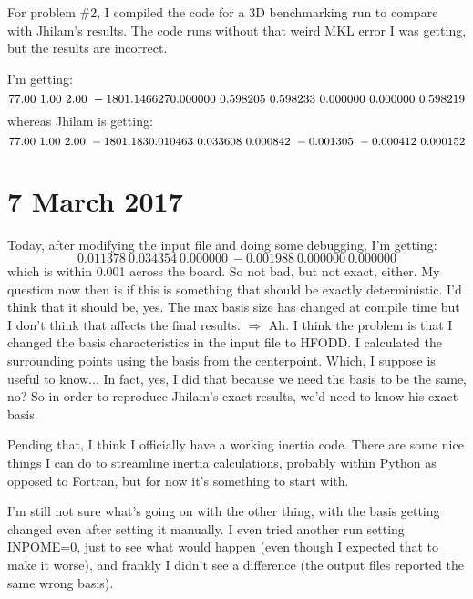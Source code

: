 \documentclass[]{report}
\begin{document}
For problem \#2, I compiled the code for a 3D benchmarking run to compare with Jhilam's results. The code runs without that weird MKL error I was getting, but the results are incorrect.

I'm getting:
\begin{equation}
   77.00\    1.00\    2.00\   -1801.146627 \\
       0.000000\    0.598205\    0.598233\    0.000000\    0.000000\    0.598219
\end{equation}
whereas Jhilam is getting:
\begin{equation}
   77.00\    1.00\    2.00\   -1801.183 \\
   0.010463\    0.033608\    0.000842\   -0.001305\   -0.000412\    0.000152
\end{equation}

\section*{7 March 2017}
Today, after modifying the input file and doing some debugging, I'm getting:
\begin{equation}
    0.011378\    0.034354\    0.000000\   -0.001988\    0.000000\    0.000000
\end{equation}
\noindent which is within 0.001 across the board. So not bad, but not exact, either. My question now then is if this is something that should be exactly deterministic. I'd think that it should be, yes. The max basis size has changed at compile time but I don't think that affects the final results. $\Rightarrow$ Ah. I think the problem is that I changed the basis characteristics in the input file to HFODD. I calculated the surrounding points using the basis from the centerpoint. Which, I suppose is useful to know... In fact, yes, I did that because we need the basis to be the same, no? So in order to reproduce Jhilam's exact results, we'd need to know his exact basis.

Pending that, I think I officially have a working inertia code. There are some nice things I can do to streamline inertia calculations, probably within Python as opposed to Fortran, but for now it's something to start with.

I'm still not sure what's going on with the other thing, with the basis getting changed even after setting it manually. I even tried another run setting INPOME=0, just to see what would happen (even though I expected that to make it worse), and frankly I didn't see a difference (the output files reported the same wrong basis).
\end{document}
